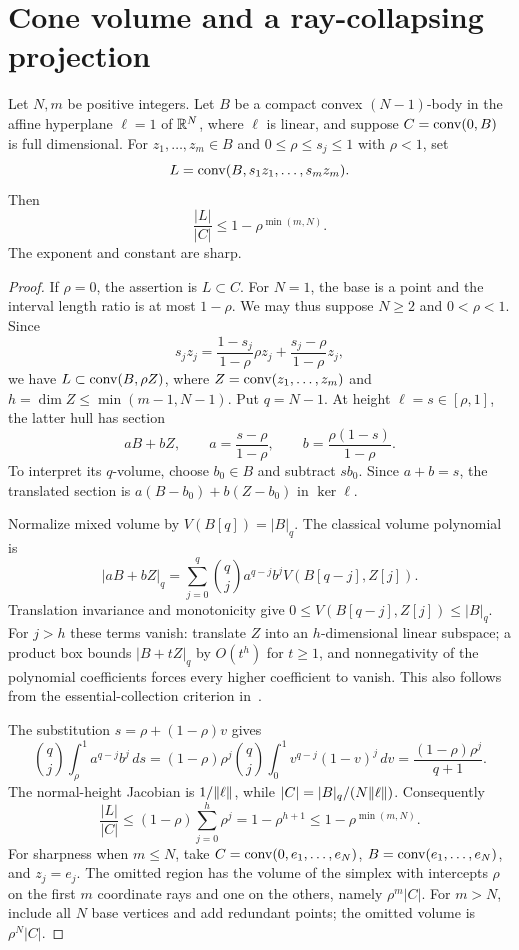 \section{Cone volume and a ray-collapsing projection}
\label{sec:cones}
\begin{lemma}\label{lem:cone}
Let $N,m$ be positive integers. Let $B$ be a compact convex
$(N-1)$-body in the affine hyperplane $\ell=1$ of $\mathbb R^N$, where $\ell$
is linear, and suppose $C=\operatorname{conv}(0,B)$ is full dimensional.
For $z_1,\ldots,z_m\in B$ and $0\le\rho\le s_j\le1$ with $\rho<1$, set
\[
 L=\operatorname{conv}(B,s_1z_1,\ldots,s_mz_m).
\]
Then
\begin{equation}\label{eq:cone}
 \frac{|L|}{|C|}\le1-\rho^{\min(m,N)}.
\end{equation}
The exponent and constant are sharp.
\end{lemma}
\begin{proof}
If $\rho=0$, the assertion is $L\subset C$. For $N=1$, the base is a point
and the interval length ratio is at most $1-\rho$. We may thus suppose
$N\ge2$ and $0<\rho<1$. Since
\[
 s_jz_j=\frac{1-s_j}{1-\rho}\rho z_j+
          \frac{s_j-\rho}{1-\rho}z_j,
\]
we have $L\subset\operatorname{conv}(B,\rho Z)$, where
$Z=\operatorname{conv}(z_1,\ldots,z_m)$ and $h=\dim Z\le\min(m-1,N-1)$.
Put $q=N-1$. At height $\ell=s\in[\rho,1]$, the latter hull has section
\begin{equation}\label{eq:section}
 aB+bZ,\qquad a=\frac{s-\rho}{1-\rho},\qquad
 b=\frac{\rho(1-s)}{1-\rho}.
\end{equation}
To interpret its $q$-volume, choose $b_0\in B$ and subtract $s b_0$.
Since $a+b=s$, the translated section is
$a(B-b_0)+b(Z-b_0)$ in $\ker\ell$.

Normalize mixed volume by $V(B[q])=|B|_q$. The classical volume polynomial is
\begin{equation}\label{eq:mv}
 |aB+bZ|_q=\sum_{j=0}^q\binom qj a^{q-j}b^j V(B[q-j],Z[j]).
\end{equation}
Translation invariance and monotonicity give
$0\le V(B[q-j],Z[j])\le |B|_q$. For $j>h$ these terms vanish:
translate $Z$ into an $h$-dimensional linear subspace; a product box bounds
$|B+tZ|_q$ by $O(t^h)$ for $t\ge1$, and nonnegativity of the polynomial
coefficients forces every higher coefficient to vanish. This also follows
from the essential-collection criterion in~\cite[Theorem 2.2]{BS}.

The substitution $s=\rho+(1-\rho)v$ gives
\[
 \binom qj\int_\rho^1a^{q-j}b^j\,ds
 =(1-\rho)\rho^j\binom qj\int_0^1v^{q-j}(1-v)^j\,dv
 =\frac{(1-\rho)\rho^j}{q+1}.
\]
The normal-height Jacobian is $1/\lVert \ell\rVert$, while
$|C|=|B|_q/(N\lVert \ell\rVert)$. Consequently
\[
 \frac{|L|}{|C|}\le(1-\rho)\sum_{j=0}^h\rho^j
 =1-\rho^{h+1}\le1-\rho^{\min(m,N)}.
\]
For sharpness when $m\le N$, take $C=\operatorname{conv}(0,e_1,\ldots,e_N)$,
$B=\operatorname{conv}(e_1,\ldots,e_N)$, and $z_j=e_j$. The omitted region has the
volume of the simplex with intercepts $\rho$ on the first $m$ coordinate
rays and one on the others, namely $\rho^m|C|$. For $m>N$, include all
$N$ base vertices and add redundant points; the omitted volume is
$\rho^N|C|$.
\end{proof}

